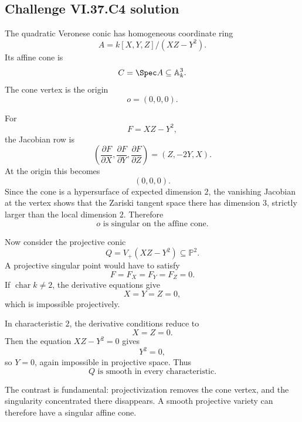 \subsection*{Challenge VI.37.C4 solution}
\begin{solution}
The quadratic Veronese conic has homogeneous coordinate ring
\[
A=k[X,Y,Z]/(XZ-Y^2).
\]
Its affine cone is
\[
C=\Spec A\subseteq\mathbb A^3_k.
\]
The cone vertex is the origin
\[
o=(0,0,0).
\]

For
\[
F=XZ-Y^2,
\]
the Jacobian row is
\[
\left(
\frac{\partial F}{\partial X},
\frac{\partial F}{\partial Y},
\frac{\partial F}{\partial Z}
\right)
=
(Z,-2Y,X).
\]
At the origin this becomes
\[
(0,0,0).
\]
Since the cone is a hypersurface of expected dimension \(2\), the vanishing Jacobian at the vertex shows that the Zariski tangent space there has dimension \(3\), strictly larger than the local dimension \(2\). Therefore
\[
\boxed{o\text{ is singular on the affine cone}.}
\]

Now consider the projective conic
\[
Q=V_+(XZ-Y^2)\subseteq\mathbb P^2.
\]
A projective singular point would have to satisfy
\[
F=F_X=F_Y=F_Z=0.
\]
If \(\operatorname{char}k\neq2\), the derivative equations give
\[
X=Y=Z=0,
\]
which is impossible projectively.

In characteristic \(2\), the derivative conditions reduce to
\[
X=Z=0.
\]
Then the equation \(XZ-Y^2=0\) gives
\[
Y^2=0,
\]
so \(Y=0\), again impossible in projective space. Thus
\[
\boxed{Q\text{ is smooth in every characteristic}.}
\]

The contrast is fundamental: projectivization removes the cone vertex, and the singularity concentrated there disappears. A smooth projective variety can therefore have a singular affine cone.
\end{solution}


